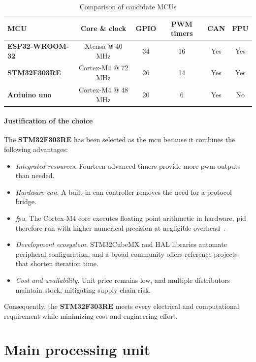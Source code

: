 \begin{table}[H]
  \centering
  \begin{tabular}{l c c c c c}
    \toprule
    \textbf{MCU} &
    \textbf{Core \& clock} &
    \textbf{GPIO} &
    \textbf{PWM timers} &
    \textbf{CAN} &
    \textbf{FPU} \\
    \midrule
    \textbf{ESP32-WROOM-32} & Xtensa @ 40 MHz & 34 & 16 & Yes & Yes\\
    \textbf{STM32F303RE} & Cortex-M4 @ 72 MHz & 26 & 14 & Yes & Yes\\
    \textbf{Arduino uno} & Cortex-M4 @ 48 MHz & 20 & 6 & Yes & No\\
    \bottomrule
  \end{tabular}
  \caption{Comparison of candidate MCUs}
  \label{tab:mcu_comparison}
\end{table}

\paragraph*{Justification of the choice}  
The \textbf{STM32F303RE} has been selected as the \gls{mcu} because it combines the following advantages:

\begin{itemize}
  \item \textit{Integrated resources}. Fourteen advanced timers provide more \gls{pwm} outputs than needed.
  \item \textit{Hardware \gls{can}}. A built-in \gls{can} controller removes the need for a protocol bridge.
  \item \textit{\gls{fpu}}. The Cortex-M4 core executes floating point arithmetic in hardware, \gls{pid} therefore run with higher numerical precision at negligible overhead~\cite{stm32f303re}.
  \item \textit{Development ecosystem}. STM32CubeMX and HAL libraries automate peripheral configuration, and a broad community offers reference projects that shorten iteration time.
  \item \textit{Cost and availability}. Unit price remains low, and multiple distributors maintain stock, mitigating supply chain risk.
\end{itemize}

Consequently, the \textbf{STM32F303RE} meets every electrical and computational requirement while minimizing cost and engineering effort.

\section{Main processing unit}

